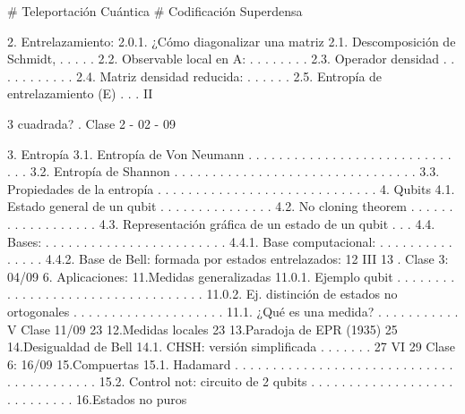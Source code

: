 
# Teleportación Cuántica
# Codificación Superdensa


2. Entrelazamiento:
2.0.1. ¿Cómo diagonalizar una matriz
2.1. Descomposición de Schmidt, . . . . .
2.2. Observable local en A: . . . . . . . .
2.3. Operador densidad . . . . . . . . . . .
2.4. Matriz densidad reducida: . . . . . .
2.5. Entropía de entrelazamiento (E) . . .
II

3
cuadrada?
.
Clase 2 - 02 - 09

3. Entropía
3.1. Entropía de Von Neumann . . . . . . . . . . . . . . . . . . . . . . . . . . . . . . 
3.2. Entropía de Shannon . . . . . . . . . . . . . . . . . . . . . . . . . . . . . . . . 
3.3. Propiedades de la entropía . . . . . . . . . . . . . . . . . . . . . . . . . . . . .
4. Qubits
4.1. Estado general de un qubit . . . . . . . . . . . . . . .
4.2. No cloning theorem . . . . . . . . . . . . . . . . . . 
4.3. Representación gráfica de un estado de un qubit . . .
4.4. Bases: . . . . . . . . . . . . . . . . . . . . . . . . 
4.4.1. Base computacional: . . . . . . . . . . . . . . .
4.4.2. Base de Bell: formada por estados entrelazados:
12
III 13
.
Clase 3: 04/09
6. Aplicaciones:
11.Medidas generalizadas
11.0.1. Ejemplo qubit . . . . . . . . . . . . . . . . . . . . . . . . . . . . . . . . . .
11.0.2. Ej. distinción de estados no ortogonales . . . . . . . . . . . . . . . . . . . .
11.1. ¿Qué es una medida? . . . . . . . . . . . 
V Clase 11/09 23
12.Medidas locales 23
13.Paradoja de EPR (1935) 25
14.Desigualdad de Bell
14.1. CHSH: versión simplificada . . . . . . . 27
VI 29
Clase 6: 16/09
15.Compuertas
15.1. Hadamard . . . . . . . . . . . . . . . . . . . . . . . . . . . . . . . . . . . . . . . . .
15.2. Control not: circuito de 2 qubits . . . . . . . . . . . . . . . . . . . . . . . . . . . . 16.Estados no puros
